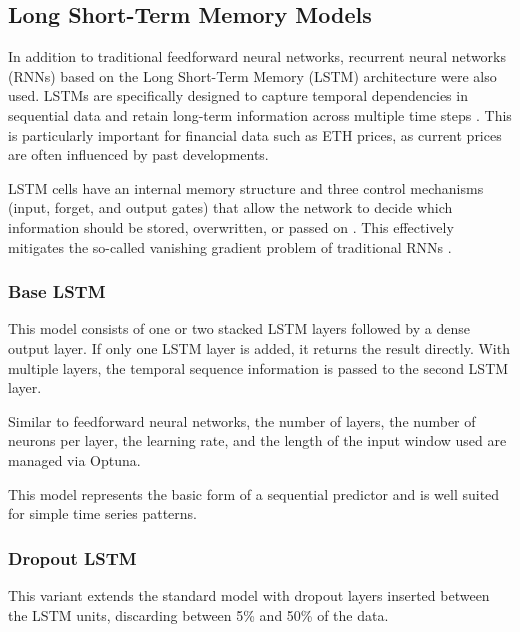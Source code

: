 

\subsection{Long Short-Term Memory Models}
\label{chap:lstm}

In addition to traditional feedforward neural networks, recurrent neural networks (RNNs) based on the Long Short-Term Memory (LSTM) architecture were also used.
LSTMs are specifically designed to capture temporal dependencies in sequential data and retain long-term information across multiple time steps \cite{lstm-usage}.
This is particularly important for financial data such as ETH prices, as current prices are often influenced by past developments.

LSTM cells have an internal memory structure and three control mechanisms (input, forget, and output gates) that allow the network to decide which information should be stored, overwritten, or passed on \cite{lstm-cell}.
This effectively mitigates the so-called vanishing gradient problem of traditional RNNs \cite{lstm-gradient-problem}.

\subsubsection{Base LSTM}

This model consists of one or two stacked LSTM layers followed by a dense output layer.
If only one LSTM layer is added, it returns the result directly.
With multiple layers, the temporal sequence information is passed to the second LSTM layer.

Similar to feedforward neural networks, the number of layers, the number of neurons per layer, the learning rate, and the length of the input window used are managed via Optuna.

This model represents the basic form of a sequential predictor and is well suited for simple time series patterns.



\subsubsection{Dropout LSTM}

This variant extends the standard model with dropout layers inserted between the LSTM units, discarding between 5\% and 50\% of the data.

